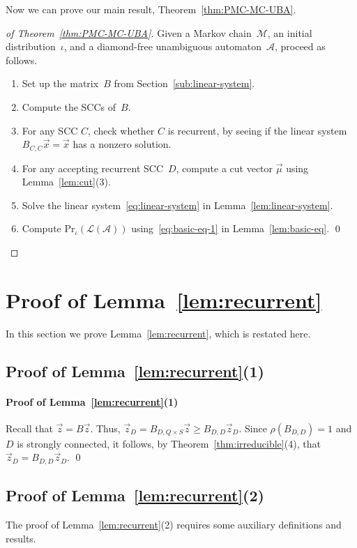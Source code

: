 \documentclass{elsarticle}
\def\cA{\mathcal{A}}
\def\cL{\mathcal{L}}
\def\cM{\mathcal{M}}
\def\Pr{\mathrm{Pr}}
\begin{document}
Now we can prove our main result, Theorem~\ref{thm:PMC-MC-UBA}.
\begin{proof}[of Theorem~\ref{thm:PMC-MC-UBA}]
Given a Markov chain~$\cM$, an initial distribution~$\iota$, and a diamond-free unambiguous automaton~$\cA$, proceed as follows.
\begin{enumerate}
\item Set up the matrix~$B$ from Section~\ref{sub:linear-system}.
\item Compute the SCCs of~$B$.
\item For any SCC $C$, check whether $C$ is recurrent, by seeing if the linear system $B_{C,C}\vec{x}=\vec{x}$ has a nonzero solution.
\item For any accepting recurrent SCC~$D$, compute a cut vector $\vec{\mu}$ using Lemma~\ref{lem:cut}(3).
\item Solve the linear system~\eqref{eq:linear-system} in Lemma~\ref{lem:linear-system}.
\item Compute $\Pr_\iota(\cL(\cA))$ using~\eqref{eq:basic-eq-1} in Lemma~\ref{lem:basic-eq}. \qed
\end{enumerate}
\end{proof}

\section{Proof of Lemma~\ref{lem:recurrent}}
\label{sec:recurrent-proof}

In this section we prove Lemma~\ref{lem:recurrent}, which is restated here.

\lemrecurrent*

\subsection{Proof of Lemma~\ref{lem:recurrent}(1)}
\paragraph{Proof of Lemma~\ref{lem:recurrent}(1)}
Recall that $\vec{z} = B \vec{z}$.
Thus, $\vec{z}_D = B_{D,Q\times S} \vec{z} \geqslant B_{D,D} \vec{z}_D$.
Since $\rho(B_{D,D}) = 1$ and $D$ is strongly connected, it follows, by Theorem~\ref{thm:irreducible}(4), that $\vec{z}_D = B_{D,D} \vec{z}_D$.  \qed

\subsection{Proof of Lemma~\ref{lem:recurrent}(2)}
The proof of Lemma~\ref{lem:recurrent}(2) requires some auxiliary
definitions and results.
\end{document}
